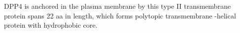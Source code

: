 
DPP4 is anchored in the plasma membrane by this type II transmembrane protein spans 22 aa in length, which forms polytopic transmembrane \alpha-helical protein with hydrophobic core.~\cite{Hong_1990}